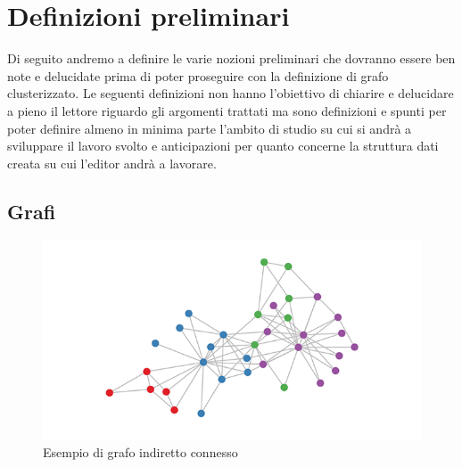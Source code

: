 \large{
\section{Definizioni preliminari}
Di seguito andremo a definire le varie nozioni preliminari che dovranno essere ben note e delucidate prima di poter proseguire con la definizione di grafo clusterizzato. Le seguenti definizioni non hanno l'obiettivo di chiarire e delucidare a pieno il lettore riguardo gli argomenti trattati ma sono definizioni e spunti per poter definire almeno in minima parte l'ambito di studio su cui si andrà a sviluppare il lavoro svolto e anticipazioni per quanto concerne la struttura dati creata su cui l'editor andrà a lavorare.

\subsection{Grafi}
\begin{figure}[!htb]
	\begin{center}
		\includegraphics[width=0.7 \linewidth]{figure/grafoGenerico}
	\end{center}
	\caption{Esempio di grafo indiretto connesso \label{fig:grafoGenerico}}
\end{figure}

}
